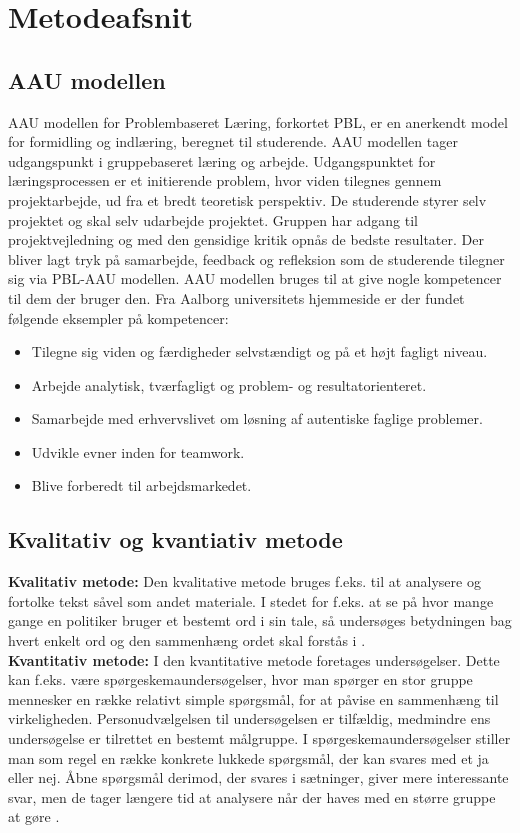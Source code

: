 \chapter{Metodeafsnit}
\section{AAU modellen}
AAU modellen for Problembaseret Læring, forkortet PBL, er en anerkendt model for formidling og indlæring, beregnet til studerende. AAU modellen tager udgangspunkt i gruppebaseret læring og arbejde. Udgangspunktet for læringsprocessen er et initierende problem, hvor viden tilegnes gennem projektarbejde, ud fra et bredt teoretisk perspektiv. De studerende styrer selv projektet og skal selv udarbejde projektet. Gruppen har adgang til projektvejledning og med den gensidige kritik opnås de bedste resultater. Der bliver lagt tryk på samarbejde, feedback og refleksion som de studerende tilegner sig via PBL-AAU modellen.
AAU modellen bruges til at give nogle kompetencer til dem der bruger den. Fra Aalborg universitets hjemmeside er der fundet følgende eksempler på kompetencer:
\begin{itemize}
\item {Tilegne sig viden og færdigheder selvstændigt og på et højt fagligt niveau.}
\item {Arbejde analytisk, tværfagligt og problem- og resultatorienteret.}
\item {Samarbejde med erhvervslivet om løsning af autentiske faglige problemer.}
\item {Udvikle evner inden for teamwork.}
\item {Blive forberedt til arbejdsmarkedet.}
\end{itemize}
\citep{Universitet2015}\citep{Universitet2011}

\section{Kvalitativ og kvantiativ metode}
\textbf{Kvalitativ metode:}
Den kvalitative metode bruges f.eks. til at analysere og fortolke tekst såvel som andet materiale. I stedet for f.eks. at se på hvor mange gange en politiker bruger et bestemt ord i sin tale, så undersøges betydningen bag hvert enkelt ord og den sammenhæng ordet skal forstås i \citep{Gymportalen}.\\ 

\noindent\textbf{Kvantitativ metode:}
I den kvantitative metode foretages undersøgelser. Dette kan f.eks. være spørgeskemaundersøgelser, hvor man spørger en stor gruppe mennesker en række relativt simple spørgsmål, for at påvise en sammenhæng til virkeligheden. Personudvælgelsen til undersøgelsen er tilfældig, medmindre ens undersøgelse er tilrettet en bestemt målgruppe. I spørgeskemaundersøgelser stiller man som regel en række konkrete lukkede spørgsmål, der kan svares med et ja eller nej. Åbne spørgsmål derimod, der svares i sætninger, giver mere interessante svar, men de tager længere tid at analysere når der haves med en større gruppe at gøre \citep{Gymportalen}.\\ 


